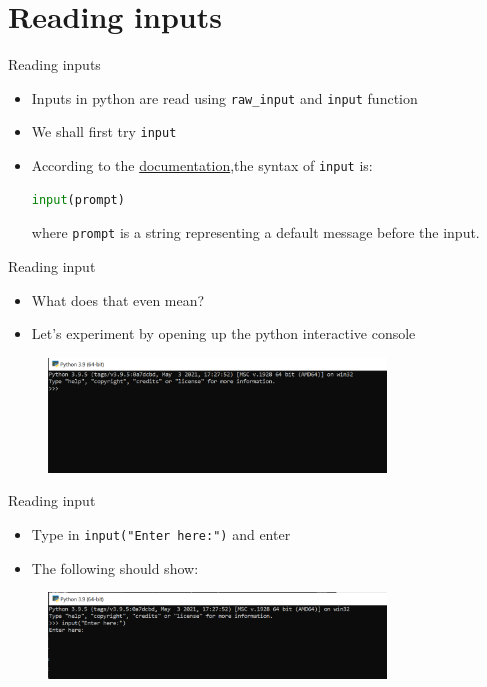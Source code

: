 \documentclass[10pt,xcolor={table,dvipsnames},t]{beamer}
\begin{document}
\section{Reading inputs}
\begin{frame}[fragile]{Reading inputs}
  \begin{itemize}
    \item Inputs in python are read using \texttt{raw\_input} and \texttt{input} function
    \item We shall first try \texttt{input}
    \item According to the \href{https://www.w3schools.com/python/ref_func_input.asp}{documentation},the syntax of \texttt{input} is:
\begin{lstlisting}[language=python]
      input(prompt)
\end{lstlisting}
  where \texttt{prompt} is a string representing a default message before the input.
  \end{itemize}
\end{frame}

\begin{frame}{Reading input}
  \begin{itemize}
    \item What does that even mean?
    \item Let's experiment by opening up the python interactive console
    
  \end{itemize}
  
  \begin{figure}
    \centering
    \includegraphics[width=0.8\textwidth]{img/repl.PNG}
  \end{figure}
\end{frame}

\begin{frame}{Reading input}
  \begin{itemize}
    \item Type in \texttt{input("Enter here:")} and enter
    \item The following should show:
  \end{itemize}
  \begin{figure}
    \centering 
    \includegraphics[width=0.8\textwidth]{img/repl-input-prompt.PNG}
  \end{figure}
\end{frame}
\end{document}

